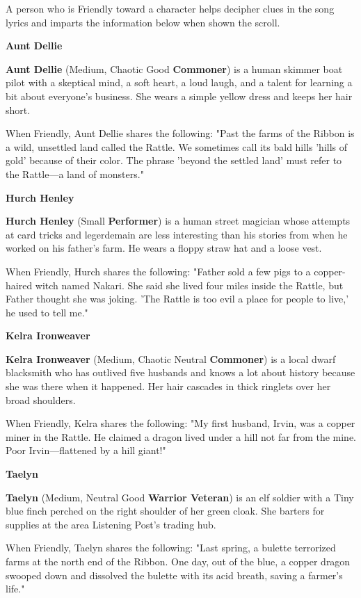 \documentclass[letterpaper, 11pt, twocolumn]{dndbook}
\begin{document}
A person who is Friendly toward a character helps decipher clues in the song lyrics and imparts the information below when shown the scroll.

\textbf{Aunt Dellie}

\textbf{Aunt Dellie} (Medium, Chaotic Good \textbf{Commoner}) is a human skimmer boat pilot with a skeptical mind, a soft heart, a loud laugh, and a talent for learning a bit about everyone's business. She wears a simple yellow dress and keeps her hair short.

When Friendly, Aunt Dellie shares the following: "Past the farms of the Ribbon is a wild, unsettled land called the Rattle. We sometimes call its bald hills 'hills of gold' because of their color. The phrase 'beyond the settled land' must refer to the Rattle---a land of monsters."

\textbf{Hurch Henley}

\textbf{Hurch Henley} (Small \textbf{Performer}) is a human street magician whose attempts at card tricks and legerdemain are less interesting than his stories from when he worked on his father's farm. He wears a floppy straw hat and a loose vest.

When Friendly, Hurch shares the following: "Father sold a few pigs to a copper-haired witch named Nakari. She said she lived four miles inside the Rattle, but Father thought she was joking. 'The Rattle is too evil a place for people to live,' he used to tell me."

\textbf{Kelra Ironweaver}

\textbf{Kelra Ironweaver} (Medium, Chaotic Neutral \textbf{Commoner}) is a local dwarf blacksmith who has outlived five husbands and knows a lot about history because she was there when it happened. Her hair cascades in thick ringlets over her broad shoulders.

When Friendly, Kelra shares the following: "My first husband, Irvin, was a copper miner in the Rattle. He claimed a dragon lived under a hill not far from the mine. Poor Irvin---flattened by a hill giant!"

\textbf{Taelyn}

\textbf{Taelyn} (Medium, Neutral Good \textbf{Warrior Veteran}) is an elf soldier with a Tiny blue finch perched on the right shoulder of her green cloak. She barters for supplies at the area Listening Post's trading hub.

When Friendly, Taelyn shares the following: "Last spring, a bulette terrorized farms at the north end of the Ribbon. One day, out of the blue, a copper dragon swooped down and dissolved the bulette with its acid breath, saving a farmer's life."
\end{document}
